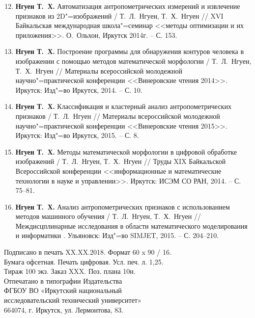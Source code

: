 \begin{enumerate}[label=\arabic*.]\setcounter{enumi}{11}
\item \textbf{Нгуен Т.~Х.} Автоматизация антропометрических измерений и извлечение признаков из 2D"=изображений / Т.~Л.~Нгуен, Т.~Х.~Нгуен // XVI Байкальская международная школа"=семинар <<методы оптимизации и их приложения>>. О.~Ольхон, Иркутск 2014г. -- С. 153.

\item\textbf{Нгуен Т.~Х.} Построение программы для обнаружения контуров человека в изображении с помощью методов математической морфологии / Т.~Л.~Нгуен, Т.~Х.~Нгуен // Материалы всероссийской молодежной научно"=практической конференции <<Винеровские чтения 2014>>. Иркутск: Изд"=во Иркутск, 2014. -- С. 10.

\item\textbf{Нгуен Т.~Х.} Классификация и кластерный анализ антропометрических признаков / Т.~Л.~Нгуен // Материалы всероссийской молодежной научно"=практической конференции <<Винеровские чтения 2015>>. Иркутск: Изд"=во Иркутск, 2015. -- С. 8.

\item\textbf{Нгуен Т.~Х.} Методы математической морфологии в цифровой обработке изображений / Т.~Л.~Нгуен, Т.~Х.~Нгуен // Труды XIX Байкальской Всероссийской конференции <<информационные и математические технологии в науке и управлении>>. Иркутск: ИСЭМ СО РАН, 2014. -- С. 75--81.

\item\textbf{Нгуен Т.~Х.} Анализ антропометрических признаков с использованием методов машинного обучения / Т.~Л.~Нгуен, Т.~Х.~Нгуен // Междисцплинарные исследования в области математического моделирования и информатики . Ульяновск: Изд"=во SIMJET, 2015. -- С. 204--210.
\end{enumerate}
\clearpage
\begin{center}
\mbox{}
\vfill
Подписано в печать XX.XX.2018. Формат 60 x 90 / 16.\\
Бумага офсетная. Печать цифровая. Усл. печ. л. 1,25.\\
Тираж 100 экз. Заказ XXX. Поз. плана 10н.\\
\vspace{0.6cm}
Отпечатано в типографии Издательства\\
ФГБОУ ВО «Иркутский национальный\\
исследовательский технический университет»\\
664074, г. Иркутск, ул. Лермонтова, 83.
\end{center}
\vfill %
\thispagestyle{empty}
